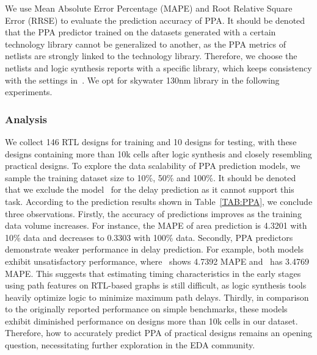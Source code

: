 We use Mean Absolute Error Percentage (MAPE) and Root Relative Square Error (RRSE) to evaluate the prediction accuracy of PPA.
It should be denoted that the PPA predictor trained on the datasets generated with a certain technology library cannot be generalized to another, as the PPA metrics of netlists are strongly linked to the technology library. Therefore, we choose the netlists and logic synthesis reports with a specific library, which keeps consistency with the settings in~\cite{xu2022sns, sengupta2022good, fang2023masterrtl}. We opt for skywater 130nm library in the following experiments. 


\subsubsection{Analysis}
We collect 146 RTL designs for training and 10 designs for testing, with these designs containing more than 10k cells after logic synthesis and closely resembling practical designs. To explore the data scalability of PPA prediction models, we sample the training dataset size to 10\%, 50\% and 100\%. It should be denoted that we exclude the model~\cite{sengupta2022good} for the delay prediction as it cannot support this task. 
According to the prediction results shown in Table~\ref{TAB:PPA}, we conclude three observations. 
Firstly, the accuracy of predictions improves as the training data volume increases. For instance, the MAPE of area prediction is 4.3201 with 10\% data and decreases to 0.3303 with 100\% data.
Secondly, PPA predictors demonstrate weaker performance in delay prediction. For example, both models exhibit unsatisfactory performance, where~\cite{xu2022sns} shows 4.7392 MAPE and~\cite{fang2023masterrtl} has 3.4769 MAPE. This suggests that estimating timing characteristics in the early stages using path features on RTL-based graphs is still difficult, as logic synthesis tools heavily optimize logic to minimize maximum path delays.
Thirdly, in comparison to the originally reported performance on simple benchmarks, these models exhibit diminished performance on designs more than 10k cells in our dataset. 
Therefore, how to accurately predict PPA of practical designs remains an opening question, necessitating further exploration in the EDA community. 

